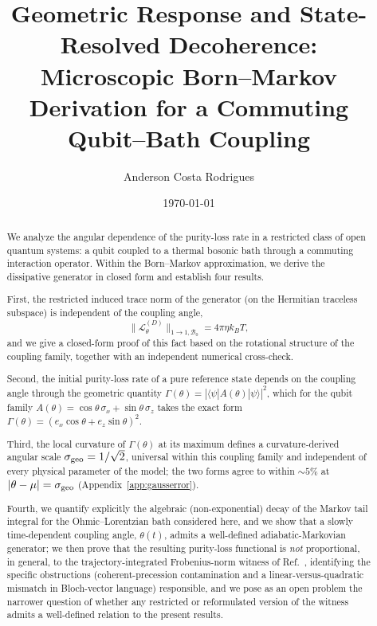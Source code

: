 \documentclass[aps,pra,reprint,superscriptaddress,nofootinbib,longbibliography]{revtex4-2}
\begin{document}
\title{
Geometric Response and State-Resolved Decoherence:\\
Microscopic Born--Markov Derivation for a Commuting Qubit--Bath Coupling
}

\author{Anderson Costa Rodrigues}


\date{\today}



\begin{abstract}

We analyze the angular dependence of the purity-loss rate in a
restricted class of open quantum systems: a qubit coupled to a thermal
bosonic bath through a commuting interaction operator.
Within the Born--Markov approximation, we derive the dissipative
generator in closed form and establish four results.

First, the restricted induced trace norm of the generator (on the
Hermitian traceless subspace) is independent of the coupling angle,
\[
\|\mathcal{L}^{(D)}_\theta\|_{1\rightarrow1,\mathcal{B}_0}
= 4\pi\eta k_BT ,
\]
and we give a closed-form proof of this fact based on the rotational
structure of the coupling family, together with an independent
numerical cross-check.

Second, the initial purity-loss rate of a pure reference state depends
on the coupling angle through the geometric quantity
$\Gamma(\theta)=|\langle\psi|A(\theta)|\psi\rangle|^2$, which for the
qubit family $A(\theta)=\cos\theta\,\sigma_x+\sin\theta\,\sigma_z$
takes the exact form $\Gamma(\theta)=(e_x\cos\theta+e_z\sin\theta)^2$.

Third, the local curvature of $\Gamma(\theta)$ at its maximum defines
a curvature-derived angular scale $\sigma_{\rm geo}=1/\sqrt2$, universal
within this coupling family and independent of every physical
parameter of the model; the two forms agree to within $\sim5\%$ at
$|\theta-\mu|=\sigma_{\rm geo}$ (Appendix~\ref{app:gausserror}).

Fourth, we quantify explicitly the algebraic (non-exponential) decay
of the Markov tail integral for the Ohmic--Lorentzian bath considered
here, and we show that a slowly time-dependent coupling angle,
$\theta(t)$, admits a well-defined adiabatic-Markovian generator; we
then prove that the resulting purity-loss functional is \emph{not}
proportional, in general, to the trajectory-integrated Frobenius-norm
witness of Ref.~\cite{rodrigues2025}, identifying the specific
obstructions (coherent-precession contamination and a
linear-versus-quadratic mismatch in Bloch-vector language)
responsible, and we pose as an open problem the narrower question of
whether any restricted or reformulated version of the witness admits a
well-defined relation to the present results.


\end{abstract}
\end{document}
